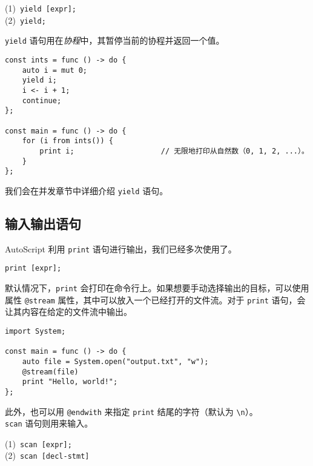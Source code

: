 \begin{grammar} \label{grm:yield-statement}
    (1)\ \lstinline!yield [expr];! \\
    (2)\ \lstinline!yield;!
\end{grammar}

\lstinline!yield! 语句用在\emph{协程}中，其暂停当前的协程并返回一个值。	

\begin{lstlisting}
const ints = func () -> do {
	auto i = mut 0;
	yield i;
	i <- i + 1;
	continue;
};

const main = func () -> do {
	for (i from ints()) {
		print i;					// 无限地打印从自然数（0, 1, 2, ...）。
	}
};
\end{lstlisting}

我们会在并发章节中详细介绍 \lstinline!yield! 语句。

\subsection{输入输出语句}

AutoScript 利用 \lstinline!print! 语句进行输出，我们已经多次使用了。

\begin{grammar} \label{grm:print-statement}
    \lstinline!print [expr];!
\end{grammar}

默认情况下，\lstinline!print! 会打印在命令行上。如果想要手动选择输出的目标，可以使用属性 \lstinline!@stream! 属性，其中可以放入一个已经打开的文件流。对于 \lstinline!print! 语句，会让其内容在给定的文件流中输出。

\begin{lstlisting}
import System;

const main = func () -> do {
    auto file = System.open("output.txt", "w");
    @stream(file)
    print "Hello, world!";
};
\end{lstlisting}

此外，也可以用 \lstinline!@endwith! 来指定 \lstinline!print! 结尾的字符（默认为 \lstinline!\n!）。 \\

\lstinline!scan! 语句则用来输入。

\begin{grammar} \label{grm:scan-statement}
    (1)\ \lstinline!scan [expr];! \\
    (2)\ \lstinline!scan [decl-stmt]!
\end{grammar}

